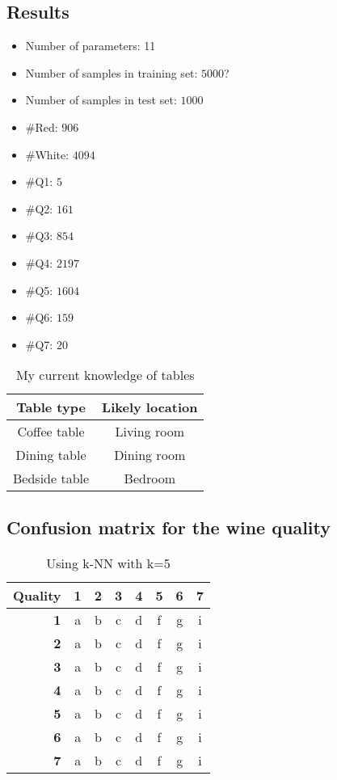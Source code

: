 \documentclass[twoside]{article}
\begin{document}
\begin{multicols}{2}

\section{Results}

\begin{itemize}
  \item Number of parameters: 11
  \item Number of samples in training set: $5000$?
  \item Number of samples in test set: $1000$
  \item \#Red: $906$
  \item \#White: $4094$
  \item \#Q1: $5$
  \item \#Q2: $161$
  \item \#Q3: $854$
  \item \#Q4: $2197$
  \item \#Q5: $1604$
  \item \#Q6: $159$
  \item \#Q7: $20$
\end{itemize}



\begin{table}[H]
\caption{My current knowledge of tables}
\centering
\begin{tabular}{cc}
\textbf{Table type} & \textbf{Likely location}\\
\midrule
Coffee table & Living room\\
Dining table & Dining room\\
Bedside table & Bedroom
\end{tabular}
\end{table}

\subsection{Confusion matrix for the wine quality}

\begin{table}[H]
\caption{Using k-NN with k=5}
\centering
\begin{tabular}{r||c|c|c|c|c|c|c}
\textbf{Quality} & \textbf{1} & \textbf{2} & \textbf{3} & \textbf{4} & \textbf{5} & \textbf{6} & \textbf{7}\\
\hline \hline
\textbf{1} & a & b & c & d & f & g & i\\
\hline
\textbf{2} & a & b & c & d & f & g & i\\
\hline
\textbf{3} & a & b & c & d & f & g & i\\
\hline
\textbf{4} & a & b & c & d & f & g & i\\
\hline
\textbf{5} & a & b & c & d & f & g & i\\
\hline
\textbf{6} & a & b & c & d & f & g & i\\
\hline
\textbf{7} & a & b & c & d & f & g & i\\
\end{tabular}
\end{table}



\end{multicols}
\end{document}

